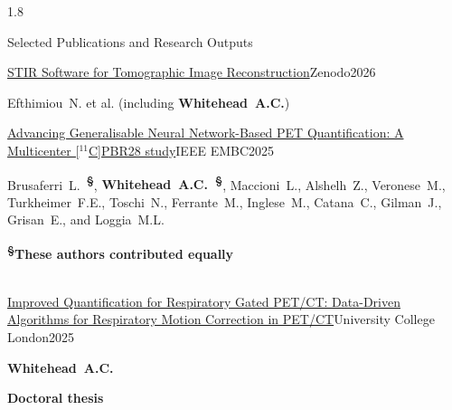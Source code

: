 \documentclass{cv}
\begin{document}
    \begin{spacing}{1.8}
        \normalsize
        
        \begin{rSection}{Selected Publications and Research Outputs}
            \vspace{-0.5cm}
            \item \begin{rSubsection}{\href{https://doi.org/10.5281/zenodo.20415609}{STIR Software for Tomographic Image Reconstruction}}{}{Zenodo}{2026}
                \vspace{-0.25cm}
                \item Efthimiou~N. et al. (including \textbf{Whitehead~A.C.})
                \\
            \end{rSubsection}
            
            \vspace{-0.5cm}
            \item \begin{rSubsection}{\href{https://doi.org/10.1109/EMBC58623.2025.11251612}{Advancing Generalisable Neural Network-Based PET Quantification: A Multicenter [$^{11}$C]PBR28 study}}{}{IEEE EMBC}{2025}
                \vspace{-0.25cm}
                \item Brusaferri~L.~\textbf{\textsuperscript{\S}}, \textbf{Whitehead~A.C.~\textsuperscript{\S}}, Maccioni~L., Alshelh~Z., Veronese~M., Turkheimer~F.E., Toschi~N., Ferrante~M., Inglese~M., Catana~C., Gilman~J., Grisan~E., and Loggia~M.L. \\
                \vspace{-0.25cm}
                \item \textbf{\textsuperscript{\S}These authors contributed equally} \\
                \\
            \end{rSubsection}

            \vspace{-0.5cm}
            \item \begin{rSubsection}{\href{https://discovery.ucl.ac.uk/id/eprint/10212970/}{Improved Quantification for Respiratory Gated PET/CT: Data-Driven Algorithms for Respiratory Motion Correction in PET/CT}}{}{University College London}{2025}
                \vspace{-0.25cm}
                \item \textbf{Whitehead~A.C.} \\
                \vspace{-0.5cm}
                \item \textbf{Doctoral thesis} \\
                \\
            \end{rSubsection}
    

\end{rSection}
\end{spacing}
\end{document}
